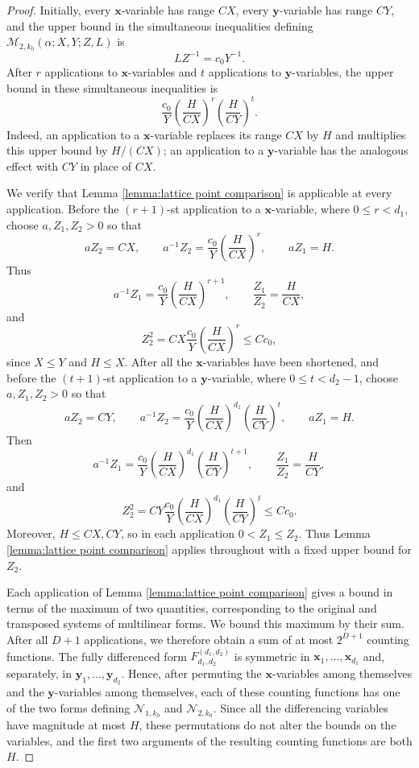 \documentclass[12pt,reqno]{amsart}
\theoremstyle{definition}
\theoremstyle{remark}
\numberwithin{equation}{section}
\def\bfx{{\mathbf x}}
\def\bfy{{\mathbf y}}
\def\a{{\alpha}} \def\bfalp{{\boldsymbol \alpha}} \def\atil{{\widetilde \alpha}}
\begin{document}
\begin{proof}
    Initially, every $\bfx$-variable has range $CX$, every $\bfy$-variable
    has range $CY$, and the upper bound in the simultaneous inequalities
    defining $\mathcal M_{2,k_0}(\a;X,Y;Z,L)$ is
    \[
        LZ^{-1}=c_0Y^{-1}.
    \]
    After $r$ applications to $\bfx$-variables and $t$ applications to
    $\bfy$-variables, the upper bound in these simultaneous inequalities is
    \[
        \frac{c_0}{Y}
        \left(\frac{H}{CX}\right)^r
        \left(\frac{H}{CY}\right)^t.
    \]
    Indeed, an application to a $\bfx$-variable replaces its range $CX$ by
    $H$ and multiplies this upper bound by $H/(CX)$; an application to a
    $\bfy$-variable has the analogous effect with $CY$ in place of $CX$.

    We verify that Lemma \ref{lemma:lattice point comparison} is applicable at every
    application. Before the $(r+1)$-st application to a $\bfx$-variable, where
    $0\leq r<d_1$, choose $a,Z_1,Z_2>0$ so that
    \[
        aZ_2=CX,
        \qquad
        a^{-1}Z_2=\frac{c_0}{Y}
        \left(\frac{H}{CX}\right)^r,
        \qquad
        aZ_1=H.
    \]
    Thus
    \[
        a^{-1}Z_1=\frac{c_0}{Y}
        \left(\frac{H}{CX}\right)^{r+1},
        \qquad
        \frac{Z_1}{Z_2}=\frac{H}{CX},
    \]
    and
    \[
        Z_2^2
        =CX\frac{c_0}{Y}
        \left(\frac{H}{CX}\right)^r
        \leq Cc_0,
    \]
    since $X\leq Y$ and $H\leq X$. After all the $\bfx$-variables have been
    shortened, and before the $(t+1)$-st application to a $\bfy$-variable,
    where $0\leq t<d_2-1$, choose $a,Z_1,Z_2>0$ so that
    \[
        aZ_2=CY,
        \qquad
        a^{-1}Z_2=\frac{c_0}{Y}
        \left(\frac{H}{CX}\right)^{d_1}
        \left(\frac{H}{CY}\right)^t,
        \qquad
        aZ_1=H.
    \]
    Then
    \[
        a^{-1}Z_1=\frac{c_0}{Y}
        \left(\frac{H}{CX}\right)^{d_1}
        \left(\frac{H}{CY}\right)^{t+1},
        \qquad
        \frac{Z_1}{Z_2}=\frac{H}{CY},
    \]
    and
    \[
        Z_2^2
        =CY\frac{c_0}{Y}
        \left(\frac{H}{CX}\right)^{d_1}
        \left(\frac{H}{CY}\right)^t
        \leq Cc_0.
    \]
    Moreover, $H\leq CX,CY$, so in each application $0<Z_1\leq Z_2$.
    Thus Lemma \ref{lemma:lattice point comparison} applies throughout with a fixed
    upper bound for $Z_2$.

    Each application of Lemma \ref{lemma:lattice point comparison} gives a bound in
    terms of the maximum of two quantities, corresponding to the original and
    transposed systems of multilinear forms. We bound this maximum by their
    sum. After all $D+1$ applications, we therefore obtain a sum of at most
    $2^{D+1}$ counting functions. The fully differenced form
    $F^{(d_1,d_2)}_{d_1,d_2}$ is symmetric in
    $\bfx_1,\ldots,\bfx_{d_1}$ and, separately, in
    $\bfy_1,\ldots,\bfy_{d_2}$. Hence, after permuting the $\bfx$-variables
    among themselves and the $\bfy$-variables among themselves, each of these
    counting functions has one of the two forms defining
    $\mathcal N_{1,k_0}$ and $\mathcal N_{2,k_0}$. Since all the
    differencing variables have magnitude at most $H$, these permutations do
    not alter the bounds on the variables, and the first two arguments of the
    resulting counting functions are both $H$.
    

\end{proof}
\end{document}
